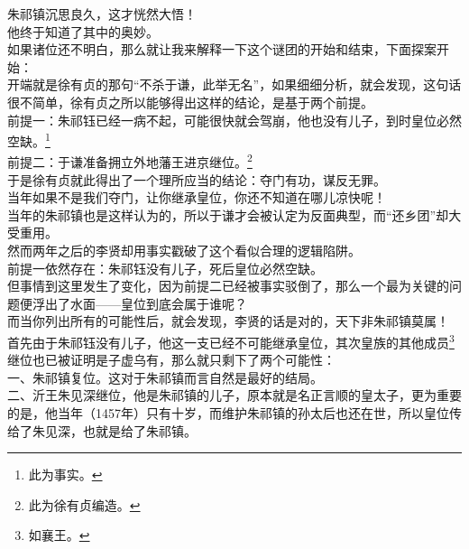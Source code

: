 \begin{multicols}{\theparacolNo}
朱祁镇沉思良久，这才恍然大悟！\\

他终于知道了其中的奥妙。\\

如果诸位还不明白，那么就让我来解释一下这个谜团的开始和结束，下面探案开始：\\

开端就是徐有贞的那句“不杀于谦，此举无名”，如果细细分析，就会发现，这句话很不简单，徐有贞之所以能够得出这样的结论，是基于两个前提。\\

前提一：朱祁钰已经一病不起，可能很快就会驾崩，他也没有儿子，到时皇位必然空缺。\footnote{此为事实。}\\

前提二：于谦准备拥立外地藩王进京继位。\footnote{此为徐有贞编造。}\\

于是徐有贞就此得出了一个理所应当的结论：夺门有功，谋反无罪。\\

当年如果不是我们夺门，让你继承皇位，你还不知道在哪儿凉快呢！\\

当年的朱祁镇也是这样认为的，所以于谦才会被认定为反面典型，而“还乡团”却大受重用。\\

然而两年之后的李贤却用事实戳破了这个看似合理的逻辑陷阱。\\

前提一依然存在：朱祁钰没有儿子，死后皇位必然空缺。\\

但事情到这里发生了变化，因为前提二已经被事实驳倒了，那么一个最为关键的问题便浮出了水面——皇位到底会属于谁呢？\\

而当你列出所有的可能性后，就会发现，李贤的话是对的，天下非朱祁镇莫属！\\

首先由于朱祁钰没有儿子，他这一支已经不可能继承皇位，其次皇族的其他成员\footnote{如襄王。}继位也已被证明是子虚乌有，那么就只剩下了两个可能性：\\

一、朱祁镇复位。这对于朱祁镇而言自然是最好的结局。\\

二、沂王朱见深继位，他是朱祁镇的儿子，原本就是名正言顺的皇太子，更为重要的是，他当年（1457年）只有十岁，而维护朱祁镇的孙太后也还在世，所以皇位传给了朱见深，也就是给了朱祁镇。\\


\end{multicols}

